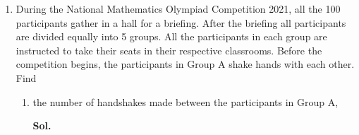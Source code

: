 \documentclass{report}
\newcommand\comb[2][^n]{{}_{#1}C_{#2}}
\newcommand{\sol}[1]{

      \noindent \textbf{Sol.}
}
\def\eos{\quad\hbox{\rlap{\hbox{\vrule depth 1.5pt height 2.6mm width 0.2mm \hskip 1mm \vrule height 2.6mm width 0.2mm}}{\vbox{\hrule height 0.2mm width 1.4mm \vskip 2.8mm \hrule depth 1.5pt height -0.35mm width 1.2mm}}}}
\begin{document}
\begin{multicols*}{2}
\begin{enumerate}
\begin{enumerate}
                              Choose 5 girls from 12 girls. There are $\comb[12]{5} = 792$ ways to choose
                              them.

                              Hence, there are $56 \times 792 = 44,352$ ways to form the team. $\eos$

                        \item the number of different teams that can be formed if the number of girls is more
                              than the number of boys, \sol{}

                              Choosing 1 boy and 9 girls, there are $\comb[8]{1} \times \comb[12]{9} =
                                    1\,760$ ways to form the team.

                              Choosing 2 boys and 8 girls, there are $\comb[8]{2} \times \comb[12]{8} =
                                    13\,860$

                              Choosing 3 boys and 7 girls, there are $\comb[8]{3} \times \comb[12]{7} =
                                    44\,352$

                              Choosing 4 boys and 6 girls, there are $\comb[8]{4} \times \comb[12]{6} =
                                    64\,680$

                              Hence, there are $1\,760 + 13\,860 + 44\,352 + 64\,680 = 124\,652$ ways to form
                              the team. $\eos$

                        \item the number of different teams that can be formed if Kamal and Ali as well as
                              Fatimah and Mei Mei must be chosen. \sol{}

                              Since 4 people must be chosen, there are 6 positions remaining.

                              Choosing 6 people from the rest of 14 people, there are $\comb[16]{6} = 8\,008$
                              ways to do so. $\eos$
                  \end{enumerate}

            \item During the National Mathematics Olympiad Competition 2021, all the 100
                  participants gather in a hall for a briefing. After the briefing all
                  participants are divided equally into 5 groups. All the participants in each
                  group are instructed to take their seats in their respective classrooms. Before
                  the competition begins, the participants in Group A shake hands with each
                  other. Find
                  \begin{enumerate}
                        \item the number of handshakes made between the participants in Group A, \sol{}


\end{enumerate}
\end{enumerate}
\end{multicols*}
\end{document}
